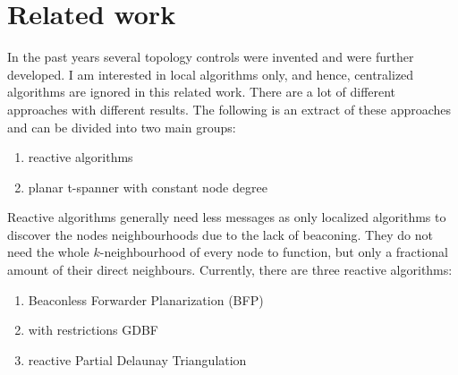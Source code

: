 

%



\section{Related work}

In the past years several topology controls were invented and were further developed.
I am interested in local algorithms only, and hence, centralized algorithms are ignored in this related work.
There are a lot of different approaches with different results.
The following is an extract of these approaches and can be divided into two main groups:
\begin{enumerate}
\item reactive algorithms
\item planar t-spanner with constant node degree
\end{enumerate}

Reactive algorithms generally need less messages as only localized algorithms to discover the nodes neighbourhoods due to the lack of beaconing.
They do not need the whole $k $-neighbourhood of every node to function, but only a fractional amount of their direct neighbours.
Currently, there are three reactive algorithms:
\begin{enumerate}
\item Beaconless Forwarder Planarization (BFP)
\item with restrictions GDBF
\item reactive Partial Delaunay Triangulation
\end{enumerate}

